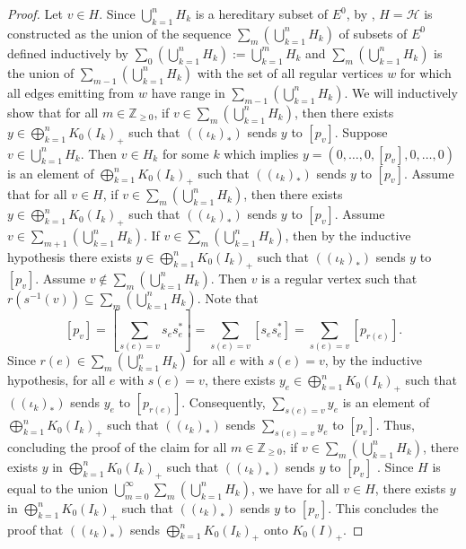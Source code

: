 \documentclass[12pt]{amsbook}%
\newcommand{\abknotation}[1]{\left(#1\right)}
\theoremstyle{defin}
\theoremstyle{remark}
\numberwithin{equation}{chapter}
\numberwithin{theor}{section}
\newcommand{\ZZ}{\mathbb{Z}}
\begin{document}
\begin{proof}
Let $v \in H$.  Since $\bigcup_{k=1}^n  H_k$ is a hereditary subset of $E^0$, by \cite[Remark~3.1]{bhrs:iccig}, $H = \mathcal{H}$ is constructed as the union of the sequence $\sum_m \left(\bigcup_{k = 1}^n H_k\right)$ of subsets of $E^0$ defined inductively by $\sum _0 \left( \bigcup_{k = 1}^n H_k\right) :=  \bigcup_{k = 1}^m H_k$ and $\sum _m\left( \bigcup_{k = 1}^n H_k\right)$ is the union of $\sum_{m-1} \left( \bigcup_{k = 1}^n H_k  \right)$ with the set of all regular vertices $w$ for which all edges emitting from $w$ have range in $\sum_{m-1} \left( \bigcup_{k = 1}^n H_k  \right)$.  We will inductively show that for all $m \in \ZZ_{\geq 0}$, if $v \in \sum _m\left( \bigcup_{k = 1}^n H_k\right)$, then there exists $y \in \bigoplus_{k=1}^n K_0(I_k)_+$ such that $\abknotation{(\iota_k)_*}$ sends $y$ to $[p_v]$.  Suppose $v \in \bigcup_{ k = 1}^n H_k$.  Then $v \in H_k$ for some $k$ which implies $y=( 0, \ldots, 0, [p_v], 0, \ldots , 0)$ is an element of $\bigoplus_{k=1}^n K_0(I_k)_+$ such that $\abknotation{(\iota_k)_*}$ sends $y$ to $[p_v]$.  Assume that for all $v \in H$, if $v \in \sum _m\left( \bigcup_{k = 1}^n H_k\right)$, then there exists $y \in \bigoplus_{k=1}^n K_0(I_k)_+$ such that $\abknotation{(\iota_k)_*}$ sends $y$ to $[p_v]$.   Assume $v \in \sum _{m+1}\left( \bigcup_{k = 1}^n H_k\right)$.  If $v \in \sum _{m}\left( \bigcup_{k = 1}^n H_k\right)$, then by the inductive hypothesis there exists $y \in \bigoplus_{k=1}^n K_0(I_k)_+$ such that $\abknotation{(\iota_k)_*}$ sends $y$ to $[p_v]$.  Assume $v \notin  \sum _{m}\left( \bigcup_{k = 1}^n H_k\right)$.  Then $v$ is a regular vertex such that $r(s^{-1}(v)) \subseteq  \sum _{m}\left( \bigcup_{k = 1}^n H_k \right)$.  Note that 
\[
[p_v] = \left[ \sum_{ s(e)=v } s_e s_e^* \right] = \sum_{ s(e)=v } [ s_e s_e^* ] =  \sum_{ s(e)=v } [ p_{r(e)} ].
\]
Since $r(e) \in \sum _{m}\left( \bigcup_{k = 1}^n H_k \right)$ for all $e$ with $s(e)=v$, by the inductive hypothesis, for all $e$ with $s(e)=v$, there exists $y_e \in \bigoplus_{ k = 1}^n K_0(I_k)_+$ such that $\abknotation{(\iota_k)_*}$ sends $y_e$ to $[p_{r(e)}]$.  Consequently, $\sum_{s(e) = v } y_e$ is an element of  $\bigoplus_{ k = 1}^n K_0(I_k)_+$ such that $\abknotation{(\iota_k)_*}$ sends $\sum_{s(e) =v } y_e$ to $[p_v]$.   Thus, concluding the proof of the claim for all $m \in \ZZ_{\geq 0}$, if $v \in \sum _m\left( \bigcup_{k = 1}^n H_k\right)$, there exists $y$ in $\bigoplus_{ k = 1}^n K_0(I_k)_+$  such that $\abknotation{(\iota_k)_*}$ sends $y$ to $[p_{v}]$ .  Since $H$ is equal to the union $\bigcup_{m =0}^\infty \sum_m \left( \bigcup_{k = 1}^n H_k\right)$, we have for all $v \in H$, there exists $y$ in $\bigoplus_{ k = 1}^n K_0(I_k)_+$ such that $\abknotation{(\iota_k)_*}$ sends $y$ to $[p_v]$.  This concludes the proof that $\abknotation{(\iota_k)_*}$ sends $\bigoplus_{ k = 1}^n K_0(I_k)_+$ onto $K_0(I)_+$.
\end{proof}
\end{document}
